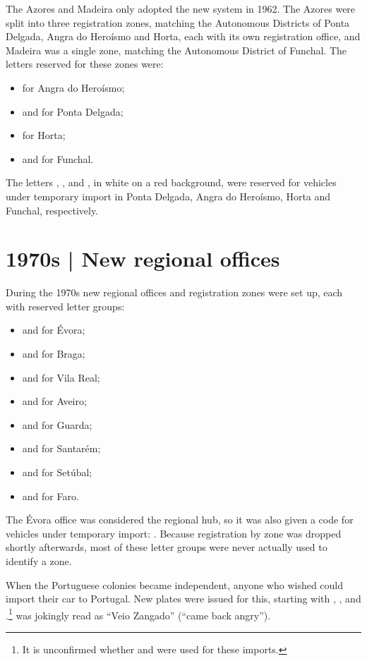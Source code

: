 The Azores and Madeira only adopted the new system in 1962. The Azores were split
into three registration zones, matching the Autonomous Districts of Ponta
Delgada, Angra do Heroísmo and Horta, each with its own registration office, and
Madeira was a single zone, matching the Autonomous District of Funchal. The
letters reserved for these zones were:
\begin{itemize}
  \item {} for Angra do Heroísmo;
  \item {} and  for Ponta Delgada;
  \item {} for Horta;
  \item {} and  for Funchal.
\end{itemize}

The letters , ,  and , in white on a red
background, were reserved for vehicles under temporary import in Ponta Delgada,
Angra do Heroísmo, Horta and Funchal, respectively.

\section{1970s | New regional offices}

During the 1970s new regional offices and registration zones were set up, each
with reserved letter groups:
\begin{itemize}
  \item {} and  for Évora;
  \item {} and  for Braga;
  \item {} and  for Vila Real;
  \item {} and  for Aveiro;
  \item {} and  for Guarda;
  \item {} and  for Santarém;
  \item {} and  for Setúbal;
  \item {} and  for Faro.
\end{itemize}

The Évora office was considered the regional hub, so it was also given a code for
vehicles under temporary import: . Because registration by zone was
dropped shortly afterwards, most of these letter groups were never actually used
to identify a zone.

When the Portuguese colonies became independent, anyone who wished could import
their car to Portugal. New plates were issued for this, starting with
, ,  and .\footnote{It is unconfirmed whether  and  were used for these imports.}
 was jokingly read as “Veio Zangado” (“came back angry”).

